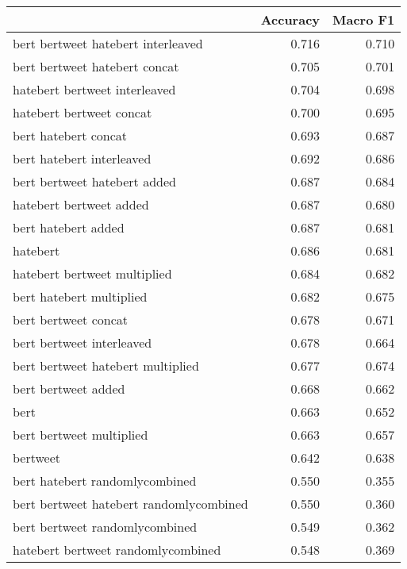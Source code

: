 \begin{tabular}{lrr}
\toprule
{} &  Accuracy &  Macro F1 \\
\midrule
bert bertweet hatebert interleaved       &     0.716 &     0.710 \\
bert bertweet hatebert concat            &     0.705 &     0.701 \\
hatebert bertweet interleaved            &     0.704 &     0.698 \\
hatebert bertweet concat                 &     0.700 &     0.695 \\
bert hatebert concat                     &     0.693 &     0.687 \\
bert hatebert interleaved                &     0.692 &     0.686 \\
bert bertweet hatebert added             &     0.687 &     0.684 \\
hatebert bertweet added                  &     0.687 &     0.680 \\
bert hatebert added                      &     0.687 &     0.681 \\
hatebert                                 &     0.686 &     0.681 \\
hatebert bertweet multiplied             &     0.684 &     0.682 \\
bert hatebert multiplied                 &     0.682 &     0.675 \\
bert bertweet concat                     &     0.678 &     0.671 \\
bert bertweet interleaved                &     0.678 &     0.664 \\
bert bertweet hatebert multiplied        &     0.677 &     0.674 \\
bert bertweet added                      &     0.668 &     0.662 \\
bert                                     &     0.663 &     0.652 \\
bert bertweet multiplied                 &     0.663 &     0.657 \\
bertweet                                 &     0.642 &     0.638 \\
bert hatebert randomlycombined           &     0.550 &     0.355 \\
bert bertweet hatebert randomlycombined  &     0.550 &     0.360 \\
bert bertweet randomlycombined           &     0.549 &     0.362 \\
hatebert bertweet randomlycombined       &     0.548 &     0.369 \\
\bottomrule
\end{tabular}
